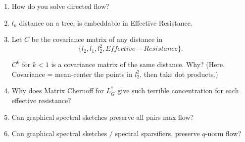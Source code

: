 \documentclass[12pt]{article}
\begin{document}
\begin{enumerate}
\item How do you solve directed flow?
\item $l_k$ distance on a tree, is embeddable in Effective Resistance.
\item Let $C$ be the covariance matrix of any distance in 
\[ \{l_2, l_1, l_2^2, Effective-Resistance\}. \]

$C^k$ for $k < 1$ is a covariance matrix of the same distance.
Why?  (Here, Covariance = mean-center the points in $l_2^2$, then
    take dot products.)
\item Why does Matrix Chernoff for $L_G^\dag$ give such terrible
concentration for each effective resistance?
\item Can graphical spectral sketches preserve all pairs max flow?
\item Can graphical spectral sketches / spectral sparsifiers, preserve
$q$-norm flow?
\end{enumerate}
\end{document}
